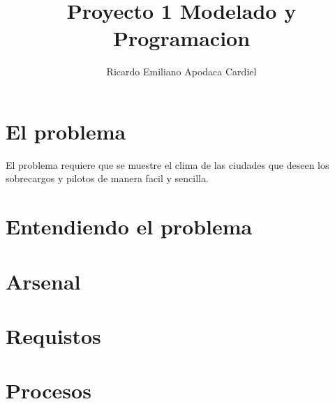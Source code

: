\documentclass{article}
\title{Proyecto 1 Modelado y Programacion}
\author{Ricardo Emiliano Apodaca Cardiel}
\date{}
\begin{document}
    \maketitle
    \tableofcontents


    \newpage

    \section{El problema}

    El problema requiere que se muestre el clima de las ciudades que deseen los sobrecargos y pilotos de manera facil y sencilla.


    \section{Entendiendo el problema}
    \label{sec:EntProb}
    

    \section{Arsenal}
    \label{sec:Arsenal}
    
    \newpage

    \section{Requistos}
    \label{sec:Requisitos}
    
    \newpage


    \section{Procesos}
    \label{sec:Procesos}
    
    
\end{document}
